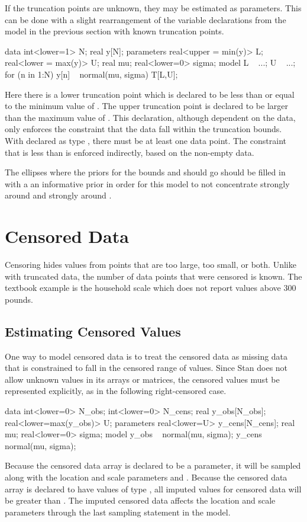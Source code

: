 If the truncation points are unknown, they may be estimated as
parameters.  This can be done with a slight rearrangement of the
variable declarations from the model in the previous section with
known truncation points.
%
\begin{stancode}
data {
  int<lower=1> N;
  real y[N];
}
parameters {
  real<upper = min(y)> L;
  real<lower = max(y)> U;
  real mu;
  real<lower=0> sigma;
}
model {
  L ~ ...;
  U ~ ...;
  for (n in 1:N)
    y[n] ~ normal(mu, sigma) T[L,U];
}
\end{stancode}
%
Here there is a lower truncation point  which is declared to
be less than or equal to the minimum value of .  The upper
truncation point  is declared to be larger than the maximum
value of .  This declaration, although dependent on the data,
only enforces the constraint that the data fall within the truncation
bounds.  With  declared as type , there must be
at least one data point.  The constraint that  is less than
 is enforced indirectly, based on the non-empty data.

The ellipses where the priors for the bounds  and 
should go should be filled in with a an informative prior in
order for this model to not concentrate  strongly around
 and  strongly around .


\section{Censored Data}

Censoring hides values from points that are too large, too small, or
both.  Unlike with truncated data, the number of data points that were
censored is known.  The textbook example is the household scale which
does not report values above 300 pounds.

\subsection{Estimating Censored Values}

One way to model censored data is to treat the censored data as
missing data that is constrained to fall in the censored range of
values.  Since Stan does not allow unknown values in its arrays or
matrices, the censored values must be represented explicitly, as in the
following right-censored case.
%
\begin{stancode}
data {
  int<lower=0> N_obs;
  int<lower=0> N_cens;
  real y_obs[N_obs];
  real<lower=max(y_obs)> U;
}
parameters {
  real<lower=U> y_cens[N_cens];
  real mu;
  real<lower=0> sigma;
}
model {
  y_obs ~ normal(mu, sigma);
  y_cens ~ normal(mu, sigma);
}
\end{stancode}
%
Because the censored data array  is declared to be a parameter, it
will be sampled along with the location and scale parameters 
and .  Because the censored data array  is
declared to have values of type , all imputed values
for censored data will be greater than .  The imputed censored
data affects the location and scale parameters through the last
sampling statement in the model.

